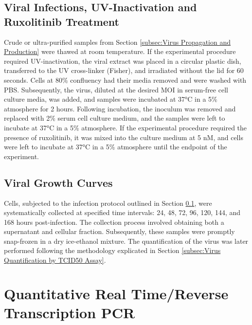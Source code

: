 \subsection{Viral Infections, UV-Inactivation and Ruxolitinib Treatment} \label{subsec:Viral Infections, UV-Inactivation and Ruxolitinib Treatment}
Crude or ultra-purified samples from Section \ref{subsec:Virus Propagation and Production} were thawed at room temperature. If the experimental procedure required UV-inactivation, the viral extract was placed in a circular plastic dish, transferred to the UV cross-linker (Fisher), and irradiated without the lid for 60 seconds. Cells at 80\% confluency had their media removed and were washed with PBS. Subsequently, the virus, diluted at the desired MOI in serum-free cell culture media, was added, and samples were incubated at 37°C in a 5\%  atmosphere for 2 hours. Following incubation, the inoculum was removed and replaced with 2\% serum cell culture medium, and the samples were left to incubate at 37°C in a 5\%  atmosphere. If the experimental procedure required the presence of ruxolitinib, it was mixed into the culture medium at 5 nM, and cells were left to incubate at 37°C in a 5\%  atmosphere until the endpoint of the experiment.

\subsection{Viral Growth Curves} \label{subsec:Viral Growth Curves}
Cells, subjected to the infection protocol outlined in Section \ref{subsec:Viral Infections, UV-Inactivation and Ruxolitinib Treatment}, were systematically collected at specified time intervals: 24, 48, 72, 96, 120, 144, and 168 hours post-infection. The collection process involved obtaining both a supernatant and cellular fraction. Subsequently, these samples were promptly snap-frozen in a dry ice-ethanol mixture. The quantification of the virus was later performed following the methodology explicated in Section \ref{subsec:Virus Quantification by TCID50 Assay}.


\section{Quantitative Real Time/Reverse Transcription PCR} \label{sec:Quantitative Real Time/Reverse Transcription PCR}
